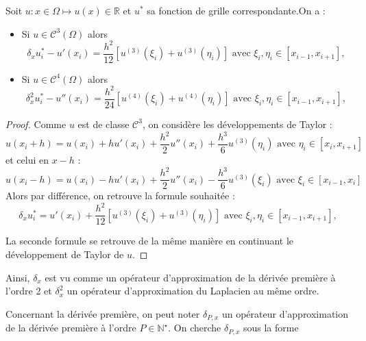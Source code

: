 \begin{proposition}
Soit $u: x \in \Omega \mapsto u(x) \in \mathbb{R}$ et $u^*$ sa fonction de grille correspondante.On a :
\begin{itemize}
\item Si $u \in \mathcal{C}^3 (\Omega)$ alors 
\begin{equation}
\delta_x u^*_i - u'(x_i) = \dfrac{h^2}{12} \left[ u^{(3)}(\xi_i) + u^{(3)}(\eta_i) \right]  \text{ avec } \xi_i , \eta_i \in [x_{i-1}, x_{i+1}],
\end{equation}
\item Si $u \in \mathcal{C}^4 (\Omega)$ alors 
\begin{equation}
\delta^2_x u^*_i - u''(x_i) = \dfrac{h^2}{24} \left[ u^{(4)}(\xi_i) + u^{(4)}(\eta_i) \right]  \text{ avec } \xi_i, \eta_i \in [x_{i-1}, x_{i+1}],
\end{equation}
\end{itemize}
\end{proposition}

\begin{proof}
Comme $u$ est de classe $\mathcal{C}^3$, on considère les développements de Taylor :
\begin{equation}
u(x_i+h) = u(x_i) + h u'(x_i) + \dfrac{h^2}{2} u''(x_i) + \dfrac{h^3}{6} u^{(3)} (\eta_i) \text{ avec } \eta_i \in [x_i, x_{i+1}]
\end{equation}
et celui en $x-h$ :
\begin{equation}
u(x_i-h) = u(x_i) - h u'(x_i) + \dfrac{h^2}{2} u''(x_i) - \dfrac{h^3}{6}u^{(3)}(\xi_i) \text{ avec } \xi_i \in [x_{i-1}, x_{i}]
\end{equation}
Alors par différence, on retrouve la formule souhaitée : 
\begin{equation}
\delta_x u^*_i = u'(x_i) + \dfrac{h^2}{12} \left[ u^{(3)}(\xi_i) + u^{(3)}(\eta_i) \right]  \text{ avec } \xi_i, \eta_i \in [x_{i-1}, x_{i+1}],
\end{equation}

La seconde formule se retrouve de la même manière en continuant le développement de Taylor de $u$.
\end{proof}

Ainsi, $\delta_x$ est vu comme un opérateur d'approximation de la dérivée première à l'ordre 2 et $\delta_x^2$ un opérateur d'approximation du Laplacien au même ordre. 

Concernant la dérivée première, on peut noter $\delta_{P,x}$ un opérateur d'approximation de la dérivée première à l'ordre $P \in \mathbb{N}^{\star}$. On cherche $\delta_{P,x}$ sous la forme

